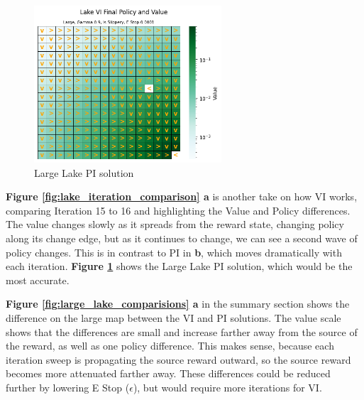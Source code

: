 \documentclass[letterpaper]{article} %
\begin{document}
\begin{figure}[!htb]
\centering
\includegraphics[width=2.75in]{Figures/Lake_VI_Final_Policy_and_Value_Large__Gamma_0_9__Is_Slippery__E_Stop_0_0001.png}
\caption{Large Lake PI solution}
\label{fig:lake_pi_large_solution}
\end{figure}

\textbf{Figure \ref{fig:lake_iteration_comparison} a} is another take on how VI works, comparing Iteration 15 to 16 and highlighting the Value and Policy differences.  The value changes slowly as it spreads from the reward state, changing policy along its change edge, but as it continues to change, we can see a second wave of policy changes.  This is in contrast to PI in \textbf{b}, which moves dramatically with each iteration.  \textbf{Figure \ref{fig:lake_pi_large_solution}} shows the Large Lake PI solution, which would be the most accurate.

\textbf{Figure \ref{fig:large_lake_comparisions} a} in the summary section shows the difference on the large map between the VI and PI solutions.  The value scale shows that the differences are small and increase farther away from the source of the reward, as well as one policy difference.  This makes sense, because each iteration sweep is propagating the source reward outward, so the source reward becomes more attenuated farther away. These differences could be reduced further by lowering E Stop ($\epsilon$), but would require more iterations for VI.
\end{document}
